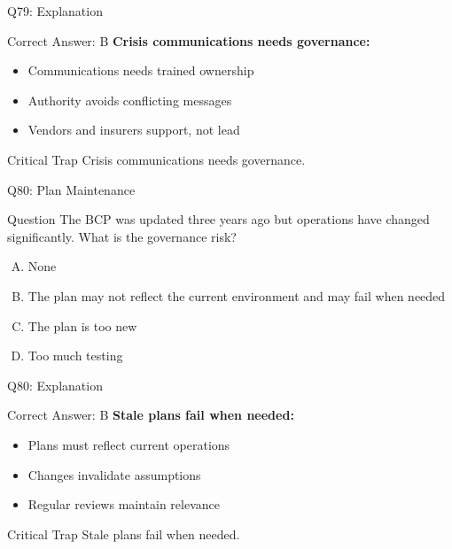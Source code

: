 \documentclass{beamer}
\begin{document}
	\begin{frame}{Q79: Explanation}
		\begin{block}{Correct Answer: B}
			\textbf{Crisis communications needs governance:}
			\begin{itemize}
				\item Communications needs trained ownership
				\item Authority avoids conflicting messages
				\item Vendors and insurers support, not lead
			\end{itemize}
		\end{block}
		\begin{alertblock}{Critical Trap}
			Crisis communications needs governance.
		\end{alertblock}
	\end{frame}
	
	\begin{frame}{Q80: Plan Maintenance}
		\begin{block}{Question}
			The BCP was updated three years ago but operations have changed significantly. What is the governance risk?
		\end{block}
		\begin{enumerate}[(A)]
			\item None
			\item The plan may not reflect the current environment and may fail when needed
			\item The plan is too new
			\item Too much testing
		\end{enumerate}
	\end{frame}
	
	\begin{frame}{Q80: Explanation}
		\begin{block}{Correct Answer: B}
			\textbf{Stale plans fail when needed:}
			\begin{itemize}
				\item Plans must reflect current operations
				\item Changes invalidate assumptions
				\item Regular reviews maintain relevance
			\end{itemize}
		\end{block}
		\begin{alertblock}{Critical Trap}
			Stale plans fail when needed.
		\end{alertblock}
	\end{frame}
	
\end{document}
